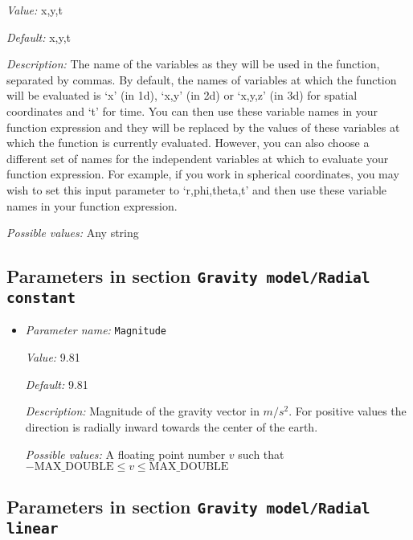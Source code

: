 \begin{itemize}
{\it Value:} x,y,t


{\it Default:} x,y,t


{\it Description:} The name of the variables as they will be used in the function, separated by commas. By default, the names of variables at which the function will be evaluated is `x' (in 1d), `x,y' (in 2d) or `x,y,z' (in 3d) for spatial coordinates and `t' for time. You can then use these variable names in your function expression and they will be replaced by the values of these variables at which the function is currently evaluated. However, you can also choose a different set of names for the independent variables at which to evaluate your function expression. For example, if you work in spherical coordinates, you may wish to set this input parameter to `r,phi,theta,t' and then use these variable names in your function expression.


{\it Possible values:} Any string
\end{itemize}

\subsection{Parameters in section \tt Gravity model/Radial constant}
\label{parameters:Gravity_20model/Radial_20constant}

\begin{itemize}
\item {\it Parameter name:} {\tt Magnitude}
\label{parameters:Gravity model/Radial constant/Magnitude}


{\it Value:} 9.81


{\it Default:} 9.81


{\it Description:} Magnitude of the gravity vector in $m/s^2$. For positive values the direction is radially inward towards the center of the earth.


{\it Possible values:} A floating point number $v$ such that $-\text{MAX\_DOUBLE} \leq v \leq \text{MAX\_DOUBLE}$
\end{itemize}

\subsection{Parameters in section \tt Gravity model/Radial linear}
\label{parameters:Gravity_20model/Radial_20linear}

